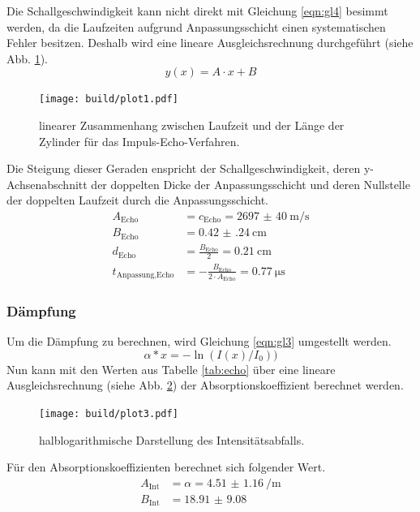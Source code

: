 Die Schallgeschwindigkeit kann nicht direkt mit Gleichung \eqref{eqn:gl4} besimmt werden, da die Laufzeiten aufgrund Anpassungsschicht einen systematischen Fehler besitzen.
Deshalb wird eine lineare Ausgleichsrechnung durchgeführt (siehe Abb. \ref{fig:plot1}).
\begin{equation}
  y(x) = A \cdot x + B
\end{equation}
\begin{figure}
  \texttt{[image: build/plot1.pdf]}
  \caption{linearer Zusammenhang zwischen Laufzeit und der Länge der Zylinder für das Impuls-Echo-Verfahren.}
  \label{fig:plot1}
\end{figure}
Die Steigung dieser Geraden enspricht der Schallgeschwindigkeit, deren y-Achsenabschnitt der doppelten Dicke der Anpassungsschicht
und deren Nullstelle der doppelten Laufzeit durch die Anpassungsschicht.
\begin{align*}
  A_\text{Echo} &= c_\text{Echo} = \SI{2697(40)}{\meter\per\second} \\
  B_\text{Echo} &= \SI{0.42(24)}{\centi\meter} \\
  d_\text{Echo} &= \frac{B_\text{Echo}}{2} = \SI{0.21}{\centi\meter} \\
  t_\text{Anpassung,Echo} &= - \frac{B_\text{Echo}}{2 \cdot A_\text{Echo}} =\SI{0.77}{\micro\second}
\end{align*}
\FloatBarrier

\subsubsection{Dämpfung}

Um die Dämpfung zu berechnen, wird Gleichung \eqref{eqn:gl3} umgestellt werden.
\begin{equation}
 \alpha*x = -\ln(I(x)/I_0))
\end{equation}
Nun kann mit den Werten aus Tabelle \ref{tab:echo} über eine lineare Ausgleichsrechnung (siehe Abb. \ref{fig:plot3}) der Absorptionskoeffizient berechnet werden.
\begin{figure}
  \texttt{[image: build/plot3.pdf]}
  \caption{halblogarithmische Darstellung des Intensitätsabfalls.}
  \label{fig:plot3}
\end{figure}
Für den Absorptionskoeffizienten berechnet sich folgender Wert.
\begin{align*}
  A_\text{Int} &= \alpha = \SI{4.51(116)}{\per\meter} \\
  B_\text{Int} &= \num{18.91(908)} \\
\end{align*}
\FloatBarrier

